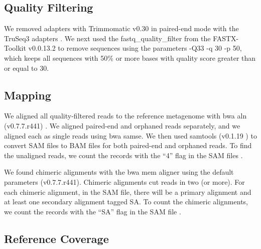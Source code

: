 \subsection*{Quality Filtering} 

We removed adapters with Trimmomatic v0.30 in paired-end mode with the
TruSeq3 adapters \cite{trim}.
We next used the fastq\_quality\_filter %
from the FASTX-Toolkit v0.0.13.2 \cite{FXtoolkit} to remove sequences  %
using the parameters -Q33 -q 30 -p 50, which keeps all sequences with 50\% or more bases with quality score greater than or equal to 30. %


\subsection*{Mapping}

We aligned all quality-filtered reads to the reference metagenome with bwa
aln (v0.7.7.r441) \cite{bwa}. %
  We aligned paired-end and orphaned reads separately,
and we aligned each as single reads using bwa samse.  We then used
samtools (v0.1.19 ) \cite{sam-stools} to convert SAM files to BAM files for both
paired-end and orphaned reads. To find the unaligned reads, we count the records with the ``4'' flag in the SAM files \cite{sam-stools}. 

We found chimeric alignments with the bwa mem aligner using the
default parameters (v0.7.7.r441).  Chimeric alignments cut reads in
two (or more).  For each chimeric alignment, in the SAM file, there
will be a primary alignment and at least one secondary alignment
tagged SA.  To count the chimeric alignments, we count the records
with the ``SA'' flag in the SAM file \cite{sam-stools}.

\subsection*{Reference Coverage} 

